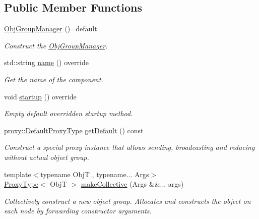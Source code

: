 \subsection*{Public Member Functions}
\begin{DoxyCompactItemize}
\item 
\hyperlink{structvt_1_1objgroup_1_1_obj_group_manager_a2de45aef25bff09a2fafabe227aa0ee7}{Obj\+Group\+Manager} ()=default
\begin{DoxyCompactList}\small\item\em Construct the \hyperlink{structvt_1_1objgroup_1_1_obj_group_manager}{Obj\+Group\+Manager}. \end{DoxyCompactList}\item 
std\+::string \hyperlink{structvt_1_1objgroup_1_1_obj_group_manager_a92c0b07c2d90063c40087f625880cca3}{name} () override
\begin{DoxyCompactList}\small\item\em Get the name of the component. \end{DoxyCompactList}\item 
void \hyperlink{structvt_1_1objgroup_1_1_obj_group_manager_ac05c002ff7fd23a39539cc8f4571bdf5}{startup} () override
\begin{DoxyCompactList}\small\item\em Empty default overridden startup method. \end{DoxyCompactList}\item 
\hyperlink{namespacevt_1_1objgroup_1_1proxy_ac7e0a0acb3b31d5469a603de08192adc}{proxy\+::\+Default\+Proxy\+Type} \hyperlink{structvt_1_1objgroup_1_1_obj_group_manager_a4447b8f4881710bc7b0b7a37de9d10b9}{get\+Default} () const
\begin{DoxyCompactList}\small\item\em Construct a special proxy instance that allows sending, broadcasting and reducing without actual object group. \end{DoxyCompactList}\item 
{\footnotesize template$<$typename ObjT , typename... Args$>$ }\\\hyperlink{structvt_1_1objgroup_1_1_obj_group_manager_aea65eef52f240a52210132eef5ce591f}{Proxy\+Type}$<$ ObjT $>$ \hyperlink{structvt_1_1objgroup_1_1_obj_group_manager_a651c44a47c6bcdc9f1b6c9e857fa03f2}{make\+Collective} (Args \&\&... args)
\begin{DoxyCompactList}\small\item\em Collectively construct a new object group. Allocates and constructs the object on each node by forwarding constructor arguments. \end{DoxyCompactList}\item 

\end{DoxyCompactItemize}
